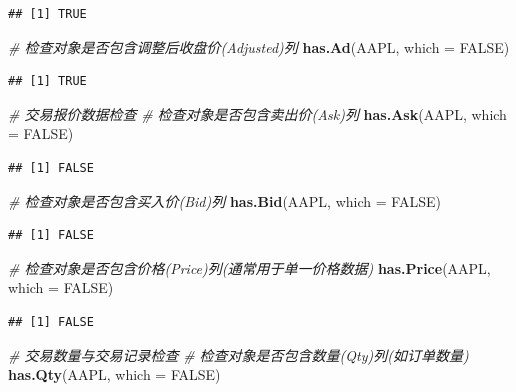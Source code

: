 \documentclass[]{ctexbook}
\newenvironment{Shaded}{\begin{snugshade}}{\end{snugshade}}
\newcommand{\AttributeTok}[1]{\textcolor[rgb]{0.13,0.29,0.53}{#1}}
\newcommand{\CommentTok}[1]{\textcolor[rgb]{0.56,0.35,0.01}{\textit{#1}}}
\newcommand{\ConstantTok}[1]{\textcolor[rgb]{0.56,0.35,0.01}{#1}}
\newcommand{\FunctionTok}[1]{\textcolor[rgb]{0.13,0.29,0.53}{\textbf{#1}}}
\newcommand{\NormalTok}[1]{#1}
\begin{document}
\begin{verbatim}
## [1] TRUE
\end{verbatim}

\begin{Shaded}
\begin{Highlighting}[]
\CommentTok{\# 检查对象是否包含调整后收盘价(Adjusted)列}
\FunctionTok{has.Ad}\NormalTok{(AAPL, }\AttributeTok{which =} \ConstantTok{FALSE}\NormalTok{)}
\end{Highlighting}
\end{Shaded}

\begin{verbatim}
## [1] TRUE
\end{verbatim}

\begin{Shaded}
\begin{Highlighting}[]
\CommentTok{\# 交易报价数据检查}
\CommentTok{\# 检查对象是否包含卖出价(Ask)列}
\FunctionTok{has.Ask}\NormalTok{(AAPL, }\AttributeTok{which =} \ConstantTok{FALSE}\NormalTok{)}
\end{Highlighting}
\end{Shaded}

\begin{verbatim}
## [1] FALSE
\end{verbatim}

\begin{Shaded}
\begin{Highlighting}[]
\CommentTok{\# 检查对象是否包含买入价(Bid)列}
\FunctionTok{has.Bid}\NormalTok{(AAPL, }\AttributeTok{which =} \ConstantTok{FALSE}\NormalTok{)}
\end{Highlighting}
\end{Shaded}

\begin{verbatim}
## [1] FALSE
\end{verbatim}

\begin{Shaded}
\begin{Highlighting}[]
\CommentTok{\# 检查对象是否包含价格(Price)列(通常用于单一价格数据)}
\FunctionTok{has.Price}\NormalTok{(AAPL, }\AttributeTok{which =} \ConstantTok{FALSE}\NormalTok{)}
\end{Highlighting}
\end{Shaded}

\begin{verbatim}
## [1] FALSE
\end{verbatim}

\begin{Shaded}
\begin{Highlighting}[]
\CommentTok{\# 交易数量与交易记录检查}
\CommentTok{\# 检查对象是否包含数量(Qty)列(如订单数量)}
\FunctionTok{has.Qty}\NormalTok{(AAPL, }\AttributeTok{which =} \ConstantTok{FALSE}\NormalTok{)}
\end{Highlighting}
\end{Shaded}
\end{document}

